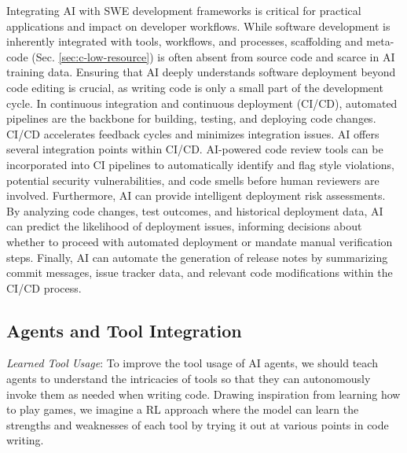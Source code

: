 Integrating AI with SWE development frameworks is critical for practical applications and impact on developer workflows. While software development is inherently integrated with tools, workflows, and processes, scaffolding and meta-code (Sec. \ref{sec:c-low-resource}) is often absent from source code and scarce in AI training data. Ensuring that AI deeply understands software deployment beyond code editing is crucial, as writing code is only a small part of the development cycle. In continuous integration and continuous deployment (CI/CD), automated pipelines are the backbone for building, testing, and deploying code changes. CI/CD accelerates feedback cycles and minimizes integration issues. AI offers several integration points within CI/CD. AI-powered code review tools can be incorporated into CI pipelines to automatically identify and flag style violations, potential security vulnerabilities, and code smells before human reviewers are involved. Furthermore, AI can provide intelligent deployment risk assessments. By analyzing code changes, test outcomes, and historical deployment data, AI can predict the likelihood of deployment issues, informing decisions about whether to proceed with automated deployment or mandate manual verification steps. Finally, AI can automate the generation of release notes by summarizing commit messages, issue tracker data, and relevant code modifications within the CI/CD process.

\vspace{-0.25cm}

\subsection{Agents and Tool Integration}

\vspace{-0.1cm}

\textit{Learned Tool Usage}: To improve the tool usage of AI agents, we should teach agents to understand the intricacies of tools so that they can autonomously invoke them as needed when writing code. Drawing inspiration from learning how to play games, we imagine a RL approach where the model can learn the strengths and weaknesses of each tool by trying it out at various points in code writing.


